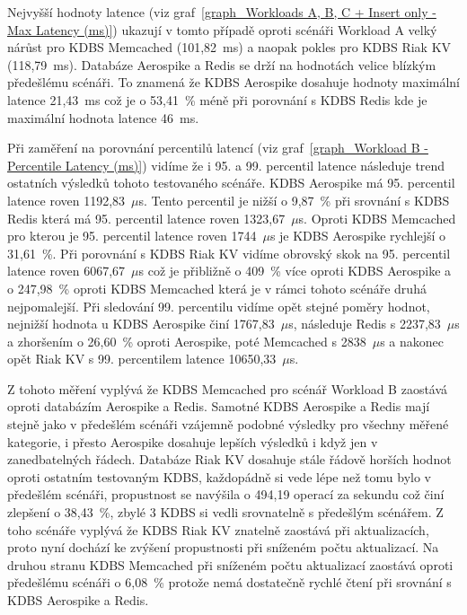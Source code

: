 \documentclass[czech,master,dept460,male,csharp,cpdeclaration]{diploma}
\begin{document}
	Nejvyšší hodnoty latence (viz graf~\ref{graph_Workloads A, B, C + Insert only - Max Latency (ms)}) ukazují v tomto případě oproti scénáři Workload A velký nárůst pro KDBS Memcached (101,82~ms) a naopak pokles pro KDBS Riak KV (118,79~ms). Databáze Aerospike a Redis se drží na hodnotách velice blízkým předešlému scénáři. To znamená že KDBS Aerospike dosahuje hodnoty maximální latence 21,43~ms což je o 53,41~\% méně při porovnání s KDBS Redis kde je maximální hodnota latence 46~ms.
	
	Při zaměření na porovnání percentilů latencí (viz graf~\ref{graph_Workload B - Percentile Latency (ms)}) vidíme že i 95. a 99. percentil latence následuje trend ostatních výsledků tohoto testovaného scénáře. KDBS Aerospike má 95. percentil latence roven 1192,83~$\mu$s. Tento percentil je nižší o 9,87~\% při srovnání s KDBS Redis která má 95. percentil latence roven 1323,67~$\mu$s. Oproti KDBS Memcached pro kterou je 95. percentil latence roven 1744~$\mu$s je KDBS Aerospike rychlejší o 31,61~\%. Při porovnání s KDBS Riak KV vidíme obrovský skok na 95. percentil latence roven 6067,67~$\mu$s což je přibližně o 409~\% více oproti KDBS Aerospike a o 247,98~\% oproti KDBS Memcached která je v rámci tohoto scénáře druhá nejpomalejší. Při sledování 99. percentilu vidíme opět stejné poměry hodnot, nejnižší hodnota u KDBS Aerospike činí 1767,83~$\mu$s, následuje Redis s 2237,83~$\mu$s a zhoršením o 26,60~\% oproti Aerospike, poté Memcached s 2838~$\mu$s a nakonec opět Riak KV s 99. percentilem latence 10650,33~$\mu$s.
	
	Z tohoto měření vyplývá že KDBS Memcached pro scénář Workload B zaostává oproti databázím Aerospike a Redis. Samotné KDBS Aerospike a Redis mají stejně jako v předešlém scénáři vzájemně podobné výsledky pro všechny měřené kategorie, i přesto Aerospike dosahuje lepších výsledků i když jen v zanedbatelných řádech. Databáze Riak KV dosahuje stále řádově horších hodnot oproti ostatním testovaným KDBS, každopádně si vede lépe než tomu bylo v předešlém scénáři, propustnost se navýšila o 494,19 operací za sekundu což činí zlepšení o 38,43~\%, zbylé 3 KDBS si vedli srovnatelně s předešlým scénářem. Z toho scénáře vyplývá že KDBS Riak KV znatelně zaostává při aktualizacích, proto nyní dochází ke zvýšení propustnosti při sníženém počtu aktualizací. Na druhou stranu KDBS Memcached při sníženém počtu aktualizací zaostává oproti předešlému scénáři o 6,08~\% protože nemá dostatečně rychlé čtení při srovnání s KDBS Aerospike a Redis.
	
\end{document}
